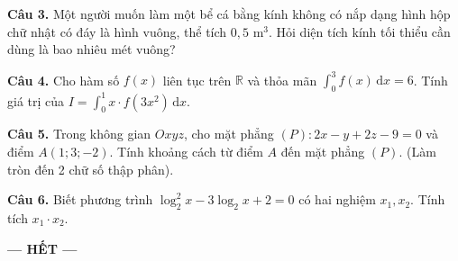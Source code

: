 \documentclass[12pt,a4paper]{article}
\begin{document}
\vspace{0.2cm}
\textbf{Câu 3.} Một người muốn làm một bể cá bằng kính không có nắp dạng hình hộp chữ nhật có đáy là hình vuông, thể tích $0{,}5\text{ m}^3$. Hỏi diện tích kính tối thiểu cần dùng là bao nhiêu mét vuông?

\vspace{0.2cm}
\textbf{Câu 4.} Cho hàm số $f(x)$ liên tục trên $\mathbb{R}$ và thỏa mãn $\int_0^3 f(x)\,\mathrm{d}x = 6$. Tính giá trị của $I = \int_0^1 x \cdot f(3x^2)\,\mathrm{d}x$.

\vspace{0.2cm}
\textbf{Câu 5.} Trong không gian $Oxyz$, cho mặt phẳng $(P): 2x - y + 2z - 9 = 0$ và điểm $A(1; 3; -2)$. Tính khoảng cách từ điểm $A$ đến mặt phẳng $(P)$. (Làm tròn đến 2 chữ số thập phân).

\vspace{0.2cm}
\textbf{Câu 6.} Biết phương trình $\log_2^2 x - 3\log_2 x + 2 = 0$ có hai nghiệm $x_1, x_2$. Tính tích $x_1 \cdot x_2$.

\begin{center}
\textbf{--- HẾT ---}
\end{center}
\end{document}
